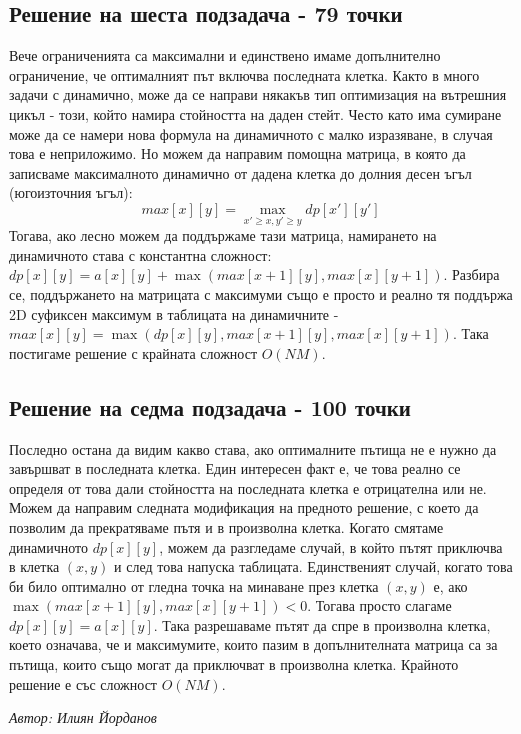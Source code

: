\documentclass[12pt]{article}
\begin{document}
\subsection{Решение на шеста подзадача - 79 точки}
Вече ограниченията са максимални и единствено имаме допълнително ограничение, че оптималният път включва последната клетка. Както в много задачи с динамично, може да се направи някакъв тип оптимизация на вътрешния цикъл - този, който намира стойността на даден стейт. Често като има сумиране може да се намери нова формула на динамичното с малко изразяване, в случая това е неприложимо. Но можем да направим помощна матрица, в която да записваме максималното динамично от дадена клетка до долния десен ъгъл (югоизточния ъгъл):
\begin{equation*}
	max[x][y]=\max_{x' \ge x, y' \ge y}{dp[x'][y']}
\end{equation*}
Тогава, ако лесно можем да поддържаме тази матрица, намирането на динамичното става с константна сложност: $dp[x][y]=a[x][y]+\max(max[x+1][y],max[x][y+1])$. Разбира се, поддържането на матрицата с максимуми също е просто и реално тя поддържа 2D суфиксен максимум в таблицата на динамичните - $max[x][y]=\max(dp[x][y],max[x+1][y],max[x][y+1])$. Така постигаме решение с крайната сложност $O(NM)$.

\subsection{Решение на седма подзадача - 100 точки}
Последно остана да видим какво става, ако оптималните пътища не е нужно да завършват в последната клетка. Един интересен факт е, че това реално се определя от това дали стойността на последната клетка е отрицателна или не. Можем да направим следната модификация на предното решение, с което да позволим да прекратяваме пътя и в произволна клетка. Когато смятаме динамичното $dp[x][y]$, можем да разгледаме случай, в който пътят приключва в клетка $(x,y)$ и след това напуска таблицата. Единственият случай, когато това би било оптимално от гледна точка на минаване през клетка $(x,y)$ е, ако $\max(max[x+1][y],max[x][y+1]) < 0$. Тогава просто слагаме $dp[x][y]=a[x][y]$. Така разрешаваме пътят да спре в произволна клетка, което означава, че и максимумите, които пазим в допълнителната матрица са за пътища, които също могат да приключват в произволна клетка. Крайното решение е със сложност $O(NM)$.
\newline

\begin{flushright}
	\textit{Автор: Илиян Йорданов}
\end{flushright}
\end{document}
